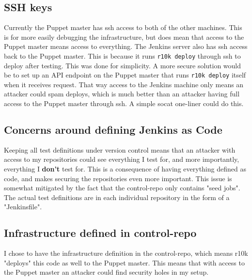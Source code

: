 \subsection{SSH keys}

Currently the Puppet master has ssh access to both of the other machines. This is for more easily debugging the infrastructure, but does mean that access to the Puppet master means access to everything. The Jenkins server also has ssh access back to the Puppet master. This is because it runs \texttt{r10k deploy} through ssh to deploy after testing. This was done for simplicity. A more secure solution would be to set up an API endpoint on the Puppet master that runs \texttt{r10k deploy} itself when it receives request. That way access to the Jenkins machine only means an attacker could spam deploys, which is much better than an attacker having full access to the Puppet master through ssh. A simple socat one-liner \cite{socatwebhook} could do this.

\subsection{Concerns around defining Jenkins as Code}

Keeping all test definitions under version control means that an attacker with access to my repositories could see everything I test for, and more importantly, everything I \textbf{don't} test for. This is a consequence of having everything defined as code, and makes securing the repositories even more important. This issue is somewhat mitigated by the fact that the control-repo only contains "seed jobs". The actual test definitions are in each individual repository in the form of a "Jenkinsfile".

\subsection{Infrastructure defined in control-repo}

I chose to have the infrastructure definition in the control-repo, which means r10k "deploys" this code as well to the Puppet master. This means that with access to the Puppet master an attacker could find security holes in my setup. 



